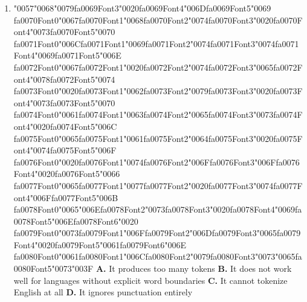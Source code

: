 \documentclass[11pt]{article}
\begin{document}
\begin{enumerate}[leftmargin=*]
  \item {\char"0057}{\char"0068}{\char"0079}{\csname fa0069Font3\endcsname\char"0020}{\csname fa0069Font4\endcsname\char"006D}{\csname fa0069Font5\endcsname\char"0069} {\csname fa0070Font0\endcsname\char"0067}{\csname fa0070Font1\endcsname\char"0068}{\csname fa0070Font2\endcsname\char"0074}{\csname fa0070Font3\endcsname\char"0020}{\csname fa0070Font4\endcsname\char"0073}{\csname fa0070Font5\endcsname\char"0070} {\csname fa0071Font0\endcsname\char"006C}{\csname fa0071Font1\endcsname\char"0069}{\csname fa0071Font2\endcsname\char"0074}{\csname fa0071Font3\endcsname\char"0074}{\csname fa0071Font4\endcsname\char"0069}{\csname fa0071Font5\endcsname\char"006E} {\csname fa0072Font0\endcsname\char"0067}{\csname fa0072Font1\endcsname\char"0020}{\csname fa0072Font2\endcsname\char"0074}{\csname fa0072Font3\endcsname\char"0065}{\csname fa0072Font4\endcsname\char"0078}{\csname fa0072Font5\endcsname\char"0074} {\csname fa0073Font0\endcsname\char"0020}{\csname fa0073Font1\endcsname\char"0062}{\csname fa0073Font2\endcsname\char"0079}{\csname fa0073Font3\endcsname\char"0020}{\csname fa0073Font4\endcsname\char"0073}{\csname fa0073Font5\endcsname\char"0070} {\csname fa0074Font0\endcsname\char"0061}{\csname fa0074Font1\endcsname\char"0063}{\csname fa0074Font2\endcsname\char"0065}{\csname fa0074Font3\endcsname\char"0073}{\csname fa0074Font4\endcsname\char"0020}{\csname fa0074Font5\endcsname\char"006C} {\csname fa0075Font0\endcsname\char"0065}{\csname fa0075Font1\endcsname\char"0061}{\csname fa0075Font2\endcsname\char"0064}{\csname fa0075Font3\endcsname\char"0020}{\csname fa0075Font4\endcsname\char"0074}{\csname fa0075Font5\endcsname\char"006F} {\csname fa0076Font0\endcsname\char"0020}{\csname fa0076Font1\endcsname\char"0074}{\csname fa0076Font2\endcsname\char"006F}{\csname fa0076Font3\endcsname\char"006F}{\csname fa0076Font4\endcsname\char"0020}{\csname fa0076Font5\endcsname\char"0066} {\csname fa0077Font0\endcsname\char"0065}{\csname fa0077Font1\endcsname\char"0077}{\csname fa0077Font2\endcsname\char"0020}{\csname fa0077Font3\endcsname\char"0074}{\csname fa0077Font4\endcsname\char"006F}{\csname fa0077Font5\endcsname\char"006B} {\csname fa0078Font0\endcsname\char"0065}{\char"006E}{\csname fa0078Font2\endcsname\char"0073}{\csname fa0078Font3\endcsname\char"0020}{\csname fa0078Font4\endcsname\char"0069}{\csname fa0078Font5\endcsname\char"006E}{\csname fa0078Font6\endcsname\char"0020} {\csname fa0079Font0\endcsname\char"0073}{\csname fa0079Font1\endcsname\char"006F}{\csname fa0079Font2\endcsname\char"006D}{\csname fa0079Font3\endcsname\char"0065}{\csname fa0079Font4\endcsname\char"0020}{\csname fa0079Font5\endcsname\char"0061}{\csname fa0079Font6\endcsname\char"006E} {\csname fa0080Font0\endcsname\char"0061}{\csname fa0080Font1\endcsname\char"006C}{\csname fa0080Font2\endcsname\char"0079}{\csname fa0080Font3\endcsname\char"0073}{\char"0065}{\csname fa0080Font5\endcsname\char"0073}{\char"003F}
    \textbf{A.} It produces too many tokens
    \textbf{B.} It does not work well for languages without explicit word boundaries
    \textbf{C.} It cannot tokenize English at all
    \textbf{D.} It ignores punctuation entirely


\end{enumerate}
\end{document}
